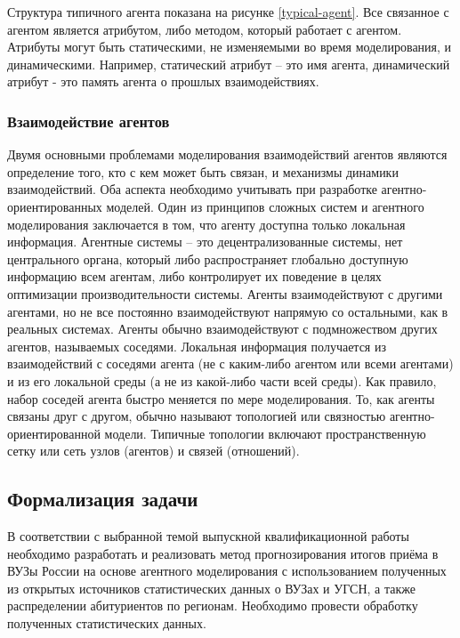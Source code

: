 Структура типичного агента показана на рисунке \ref{typical-agent}.  Все связанное с агентом является атрибутом, либо методом, который работает с агентом. Атрибуты могут быть статическими, не изменяемыми во время моделирования, и динамическими. Например, статический атрибут – это имя агента, динамический атрибут - это память агента о прошлых взаимодействиях.


\subsubsection{Взаимодействие агентов}

Двумя основными проблемами моделирования взаимодействий агентов являются определение того, кто с кем может быть связан, и механизмы динамики взаимодействий. Оба аспекта необходимо учитывать при разработке агентно-ориентированных моделей. Один из принципов сложных систем и агентного моделирования заключается в том, что агенту доступна только локальная информация. Агентные системы – это децентрализованные системы, нет центрального органа, который либо распространяет глобально доступную информацию всем агентам, либо контролирует их поведение в целях оптимизации производительности системы. Агенты взаимодействуют с другими агентами, но не все постоянно взаимодействуют напрямую со остальными, как в реальных системах. Агенты обычно взаимодействуют с подмножеством других агентов, называемых соседями. Локальная информация получается из взаимодействий с соседями агента (не с каким-либо агентом или всеми агентами) и из его локальной среды (а не из какой-либо части всей среды). Как правило, набор соседей агента быстро меняется по мере моделирования. То, как агенты связаны друг с другом, обычно называют топологией или связностью агентно-ориентированной модели. Типичные топологии включают пространственную сетку или сеть узлов (агентов) и связей (отношений).

\subsection{Формализация задачи}

В соответствии с выбранной темой выпускной квалификационной работы необходимо разработать и реализовать метод прогнозирования итогов
приёма в ВУЗы России на основе агентного моделирования с использованием полученных из открытых источников статистических данных о ВУЗах и УГСН, а также распределении абитуриентов по регионам. Необходимо провести обработку полученных статистических данных. 


